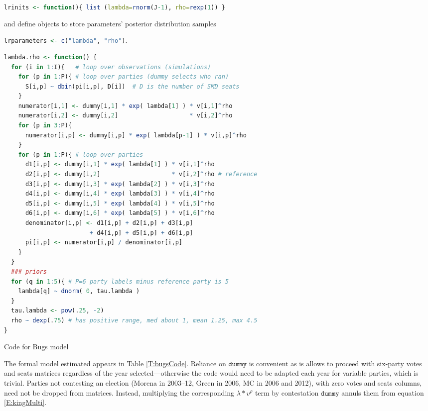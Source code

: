 \documentclass[letter,12pt]{article}
\begin{document}
\begin{center}
\lstinline[language=R]!lrinits <- function(){ list (lambda=rnorm(J-1), rho=rexp(1)) }!
\end{center}

\noindent and define objects to store  parameters' posterior distribution samples

\begin{center}
\lstinline[language=R]!lrparameters <- c("lambda", "rho")!.
\end{center}

\lstset{style=mystyle}
\begin{table}
\centering
{}
\begin{lstlisting}[language=R]
lambda.rho <- function() {
  for (i in 1:I){   # loop over observations (simulations)
    for (p in 1:P){ # loop over parties (dummy selects who ran)
      S[i,p] ~ dbin(pi[i,p], D[i])  # D is the number of SMD seats
    }
    numerator[i,1] <- dummy[i,1] * exp( lambda[1] ) * v[i,1]^rho
    numerator[i,2] <- dummy[i,2]                    * v[i,2]^rho
    for (p in 3:P){
      numerator[i,p] <- dummy[i,p] * exp( lambda[p-1] ) * v[i,p]^rho
    }
    for (p in 1:P){ # loop over parties
      d1[i,p] <- dummy[i,1] * exp( lambda[1] ) * v[i,1]^rho 
      d2[i,p] <- dummy[i,2]                    * v[i,2]^rho # reference
      d3[i,p] <- dummy[i,3] * exp( lambda[2] ) * v[i,3]^rho 
      d4[i,p] <- dummy[i,4] * exp( lambda[3] ) * v[i,4]^rho 
      d5[i,p] <- dummy[i,5] * exp( lambda[4] ) * v[i,5]^rho 
      d6[i,p] <- dummy[i,6] * exp( lambda[5] ) * v[i,6]^rho 
      denominator[i,p] <- d1[i,p] + d2[i,p] + d3[i,p] 
                        + d4[i,p] + d5[i,p] + d6[i,p]
      pi[i,p] <- numerator[i,p] / denominator[i,p]
    }
  }
  ### priors
  for (q in 1:5){ # P=6 party labels minus reference party is 5
    lambda[q] ~ dnorm( 0, tau.lambda )
  }
  tau.lambda <- pow(.25, -2)
  rho ~ dexp(.75) # has positive range, med about 1, mean 1.25, max 4.5
}
\end{lstlisting}
\caption{Code for Bugs model}\label{T:bugsCode}
\end{table}

The formal model estimated appears in Table \ref{T:bugsCode}. Reliance on $\texttt{dummy}$ is convenient as is allows to proceed with six-party votes and seats matrices regardless of the year selected---otherwise the code would need to be adapted each year for variable parties, which is trivial. Parties not contesting an election (Morena in 2003--12, Green in 2006, MC in 2006 and 2012), with zero votes and seats columns, need not be dropped from matrices. Instead, multiplying the corresponding $\lambda * v^\rho$ term by contestation $\texttt{dummy}$ annuls them from equation \ref{E:kingMulti}. 
\end{document}
